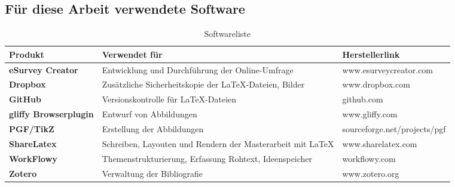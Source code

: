 \documentclass[main.tex]{subfiles}
\begin{document}
\subsection*{Für diese Arbeit verwendete Software}


\begin{table}[H]
\caption{Softwareliste}
\label{used-sw}


\begin{tabular}{ |p{3cm}|p{8cm}|l| }


\hline
\rowcolor[HTML]{C0C0C0} 
\textbf{Produkt} & \textbf{Verwendet für} & \textbf{Herstellerlink}\\ 
\hline


\textbf{eSurvey Creator} & Entwicklung und Durchführung der Online-Umfrage & www.esurveycreator.com \\ \hline
\textbf{Dropbox} & Zusätzliche Sicherheitskopie der \LaTeX  -Dateien, Bilder & www.dropbox.com \\ \hline
\textbf{GitHub} & Versionskontrolle für \LaTeX  -Dateien & github.com \\ \hline
\textbf{gliffy Browserplugin} & Entwurf von Abbildungen & www.gliffy.com \\ \hline
\textbf{PGF/TikZ} & Erstellung der Abbildungen & sourceforge.net/projects/pgf \\ \hline
\textbf{ShareLatex} & Schreiben, Layouten und Rendern der Masterarbeit mit \LaTeX & www.sharelatex.com \\ \hline
\textbf{WorkFlowy} & Themenstrukturierung, Erfassung Rohtext, Ideenspeicher & workflowy.com \\ \hline
\textbf{Zotero} & Verwaltung der Bibliografie & www.zotero.org \\ \hline

\end{tabular}
\end{table}
\end{document}

